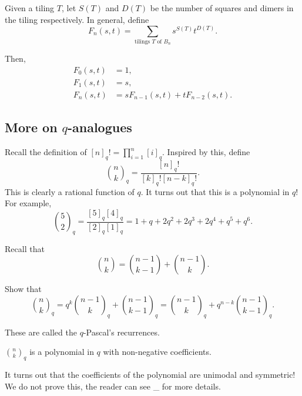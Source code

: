 	Given a tiling $T$, let $S(T)$ and $D(T)$ be the number of squares and dimers in the tiling respectively.
	In general, define
	\begin{equation}
		\label{eqn: board tiling polynomial}
		F_n(s,t) = \sum_{\text{tilings $T$ of $B_n$}} s^{S(T)} t^{D(T)}.
	\end{equation}

	Then,
	\begin{align*}
		F_0(s,t) &= 1, \\
		F_1(s,t) &= s, \\
		F_n(s,t) &= sF_{n-1}(s,t) + tF_{n-2}(s,t).
	\end{align*}

\subsection{More on $q$-analogues}

	Recall the definition of $[n]_q! = \prod_{i=1}^n [i]_q$. Inspired by this, define
	\[ \binom{n}{k}_q = \frac{[n]_q!}{[k]_q![n-k]_q!}. \]
	This is clearly a rational function of $q$. It turns out that this is a polynomial in $q$! For example,
	\[ \binom{5}{2}_q = \frac{[5]_q[4]_q}{[2]_q[1]_q} = 1 + q + 2q^2 + 2q^3 + 2q^4 + q^5 + q^6. \]

	Recall that
	\[ \binom{n}{k} = \binom{n-1}{k-1} + \binom{n-1}{k}. \]

	\begin{exercise}
		Show that
		\[ \binom{n}{k}_q = q^k \binom{n-1}{k}_q + \binom{n-1}{k-1}_q = \binom{n-1}{k}_q + q^{n-k} \binom{n-1}{k-1}_q . \]
	\end{exercise}
	These are called the $q$-Pascal's recurrences.

	\begin{fcor}
		$\binom{n}{k}_q$ is a polynomial in $q$ with non-negative coefficients.
	\end{fcor}
	It turns out that the coefficients of the polynomial are unimodal and symmetric! We do not prove this, the reader can see \_ for more details.


